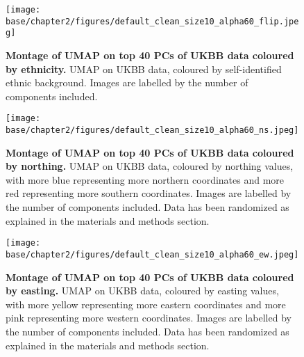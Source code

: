 \newpage

\begin{figure}[ht]
    \centering
    \texttt{[image: base/chapter2/figures/default\_clean\_size10\_alpha60\_flip.jpeg]}
    \caption[Montage of UMAP on top 40 PCs of UKBB data coloured by ethnicity]{\textbf{Montage of UMAP on top 40 PCs of UKBB data coloured by ethnicity.} UMAP on UKBB data, coloured by self-identified ethnic background. Images are labelled by the number of components included.}
    \label{fig:supp_montage_ukbb_eth}
\end{figure}

\newpage

\begin{figure}[ht]
    \centering
    \texttt{[image: base/chapter2/figures/default\_clean\_size10\_alpha60\_ns.jpeg]}
    \caption[Montage of UMAP on top 40 PCs of UKBB data coloured by northing]{\textbf{Montage of UMAP on top 40 PCs of UKBB data coloured by northing.} UMAP on UKBB data, coloured by northing values, with more blue representing more northern coordinates and more red representing more southern coordinates. Images are labelled by the number of components included. Data has been randomized as explained in the materials and methods section.}
    \label{fig:supp_montage_ukbb_ns}
\end{figure}

\newpage

\begin{figure}[ht]
    \centering
    \texttt{[image: base/chapter2/figures/default\_clean\_size10\_alpha60\_ew.jpeg]}
    \caption[Montage of UMAP on top 40 PCs of UKBB data coloured by easting]{\textbf{Montage of UMAP on top 40 PCs of UKBB data coloured by easting.} UMAP on UKBB data, coloured by easting values, with more yellow representing more eastern coordinates and more pink representing more western coordinates. Images are labelled by the number of components included. Data has been randomized as explained in the materials and methods section.}
    \label{fig:supp_montage_ukbb_ew}
\end{figure}

\newpage


